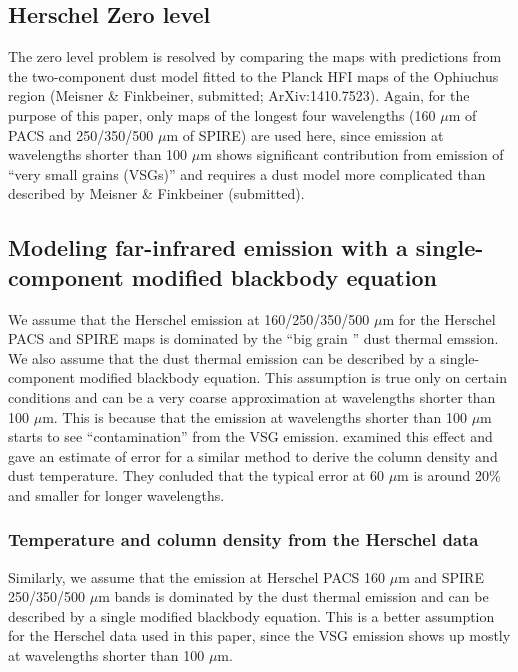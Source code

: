 \documentclass[11pt,a4paper]{emulateapj}
\begin{document}
\subsection{Herschel Zero level}
The zero level problem is resolved by comparing the maps with predictions from the two-component dust model fitted to the Planck HFI maps of the Ophiuchus region (Meisner \& Finkbeiner, submitted; ArXiv:1410.7523). Again, for the purpose of this paper, only maps of the longest four wavelengths (160 $\mu$m of PACS and 250/350/500 $\mu$m of SPIRE) are used here, since emission at wavelengths shorter than 100 $\mu$m shows significant contribution from emission of ``very small grains (VSGs)'' and requires a dust model more complicated than described by Meisner \& Finkbeiner (submitted).

\subsection{Modeling far-infrared emission with a single-component modified blackbody equation}
We assume that the Herschel emission at 160/250/350/500 $\mu$m for the Herschel PACS and SPIRE maps is dominated by the ``big grain \citep[BG;][]{Stepnik_2003}'' dust thermal emssion. We also assume that the dust thermal emission can be described by a single-component modified blackbody equation. This assumption is true only on certain conditions and can be a very coarse approximation at wavelengths shorter than 100 $\mu$m. This is because that the emission at wavelengths shorter than 100 $\mu$m starts to see ``contamination'' from the VSG emission. \citet{Schnee_2007} examined this effect and gave an estimate of error for a similar method to derive the column density and dust temperature. They conluded that the typical error at 60 $\mu$m is around 20\% and smaller for longer wavelengths. %


\subsubsection{Temperature and column density from the Herschel data}
Similarly, we assume that the emission at Herschel PACS 160 $\mu$m and SPIRE 250/350/500 $\mu$m bands is dominated by the dust thermal emission and can be described by a single modified blackbody equation. This is a better assumption for the Herschel data used in this paper, since the VSG emission shows up mostly at wavelengths shorter than 100 $\mu$m.
\end{document}
